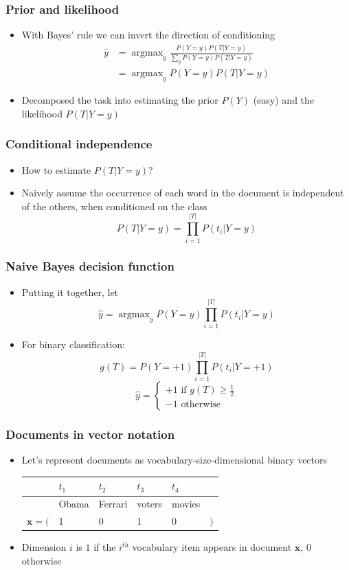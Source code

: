 \documentclass[14pt,mathserif]{beamer}
\DeclareMathOperator*{\argmax}{argmax}
\newcommand{\x}{\mathbf{x}}
\begin{document}
\begin{frame}
  \frametitle{Prior and likelihood}
  \begin{itemize}
  \item With Bayes' rule we can invert the direction of conditioning
\begin{align}\nonumber
\hat{y} & = \argmax_y \frac{P(Y=y)P(T|Y=y)}{\sum_y P(Y=y)P(T|Y=y) }\\\nonumber
        & = \argmax_y P(Y=y)P(T|Y=y)
\end{align}
\item Decomposed the task into estimating the prior $P(Y)$ (easy) and
  the likelihood $P(T|Y=y)$
  \end{itemize}
\end{frame}


\begin{frame}
  \frametitle{Conditional independence}
  \begin{itemize}
  \item How to estimate $P(T|Y=y)$?
  \item \alert{Naively} assume the occurrence of each word in the document is
    independent of the others, when conditioned on the class
    \[
    P(T|Y=y) = \prod_{i=1}^{|T|} P(t_i|Y=y)
    \]
  \end{itemize}
\end{frame}



\begin{frame}\frametitle{Naive Bayes decision function}
  \begin{itemize}
  \item Putting it together, let 
    \[
   \hat{y} = \argmax_y P(Y=y)\prod_{i=1}^{|T|} P(t_i|Y=y)
    \]
  \item For binary classification:
    \[
    g(T) = P(Y=+1)\prod_{i=1}^{|T|} P(t_i|Y=+1)
    \]
    \[
    \hat{y} = 
    \begin{cases}
      +1 \text{ if } g(T) \geq \frac{1}{2}\\
      -1 \text{ otherwise }
    \end{cases}
    \]
  \end{itemize}
\end{frame}

\begin{frame}
  \frametitle{Documents in vector notation}
  \begin{itemize}
  \item Let's represent documents as vocabulary-size-dimensional
    binary vectors 

    \begin{tabular}{rlllll}
          &    $t_1$& $t_2$   & $t_3$   & $t_4$   & \\\hline
          & Obama   & Ferrari & voters  & movies & \\\hline
$\x = ($   & 1       & 0       & 1       & 0 & $)$\\
    \end{tabular}
  \item Dimension $i$ is $1$ if the $i^{th}$ vocabulary item appears in
    document $\x$, $0$ otherwise
  \end{itemize}
\end{frame}
\end{document}
